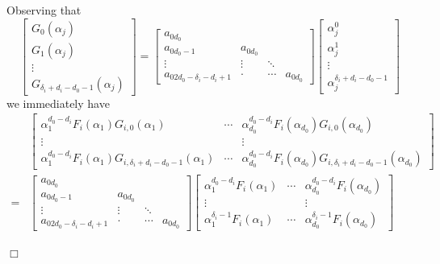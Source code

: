 \documentclass{article}
\newenvironment{proof}{\noindent{\em Proof:}}{$\Box$~\\}
\begin{document}
\begin{proof}
\begin{enumerate}
Observing that
$$\begin{bmatrix}
G_{0}(\alpha_j)\\
G_{1}(\alpha_j)\\
\vdots\\
G_{\delta_i+d_i-d_0-1}(\alpha_j)
\end{bmatrix}=\begin{bmatrix}
a_{0d_0}\\
a_{0d_0-1}&a_{0d_0}\\
\vdots&\vdots&\ddots\\
a_{02d_0-\delta_i-d_i+1}&\cdot&\cdots&a_{{0d_0}}
\end{bmatrix}
\begin{bmatrix}
\alpha_j^{0}\\\alpha_j^1\\\vdots\\\alpha_j^{\delta_i+d_i-d_0-1}
\end{bmatrix}$$
we immediately have
\begin{align*}&
\begin{bmatrix}
\alpha_1^{{d_0} - {d_i}}{F_i}({\alpha_1})G_{i,0}(\alpha_1)& \cdots &
 \alpha_{{d_0}}^{{d_0} - {d_i}}{F_i}({\alpha_{{d_0}}})G_{i,0}(\alpha_{d_0})\\
  \vdots && \vdots \\
{\alpha _1^{{d_0} - {d_i}}{F_i}({\alpha _1})G_{i,\delta_i+d_i-d_0-1}(\alpha_1)}& \cdots &
{\alpha_{{d_0}}^{{d_0} - {d_i}}{F_i}({\alpha _{{d_0}}})G_{i,\delta_i+d_i-d_0-1}(\alpha_{d_0})}
\end{bmatrix}\\
=&\begin{bmatrix}
a_{0d_0}\\
a_{0d_0-1}&a_{0d_0}\\
\vdots&\vdots&\ddots\\
a_{02d_0-\delta_i-d_i+1}&\cdot&\cdots&a_{{0d_0}}
\end{bmatrix}\begin{bmatrix}
{\alpha _1^{{d_0} - {d_i}}{F_i}({\alpha _1})}& \cdots &{\alpha _{{d_0}}^{{d_0} - {d_i}}{F_i}({\alpha _{{d_0}}})}\\
 \vdots &{}& \vdots \\
{\alpha _1^{{\delta _i} - 1}{F_i}({\alpha _1})}& \cdots &{\alpha _{{d_0}}^{{\delta _i} - 1}{F_i}({\alpha _{{d_0}}})}
\end{bmatrix}
\end{align*}


\end{enumerate}
\end{proof}
\end{document}
